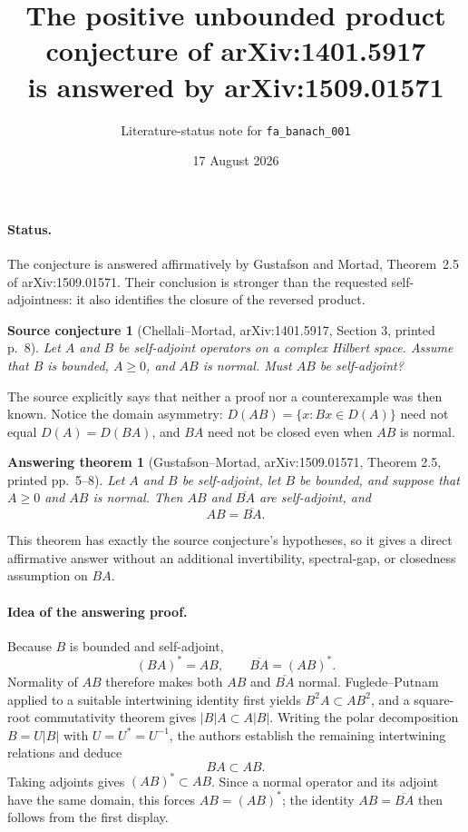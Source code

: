 \documentclass[10pt]{article}
\title{The positive unbounded product conjecture of arXiv:1401.5917\\
is answered by arXiv:1509.01571}
\author{Literature-status note for \texttt{fa\_banach\_001}}
\date{17 August 2026}
\newtheorem*{question}{Source conjecture}
\newtheorem*{answer}{Answering theorem}
\begin{document}
\maketitle

\paragraph{Status.}
The conjecture is answered affirmatively by Gustafson and Mortad,
Theorem~2.5 of arXiv:1509.01571.  Their conclusion is stronger than the
requested self-adjointness: it also identifies the closure of the reversed
product.

\begin{question}[Chellali--Mortad, arXiv:1401.5917, Section 3, printed p.~8]
Let $A$ and $B$ be self-adjoint operators on a complex Hilbert space.  Assume
that $B$ is bounded, $A\geq0$, and $AB$ is normal.  Must $AB$ be
self-adjoint?
\end{question}

The source explicitly says that neither a proof nor a counterexample was then
known.  Notice the domain asymmetry: $D(AB)=\{x:Bx\in D(A)\}$ need not equal
$D(A)=D(BA)$, and $BA$ need not be closed even when $AB$ is normal.

\begin{answer}[Gustafson--Mortad, arXiv:1509.01571, Theorem 2.5,
printed pp.~5--8]
Let $A$ and $B$ be self-adjoint, let $B$ be bounded, and suppose that
$A\geq0$ and $AB$ is normal.  Then $AB$ and $\overline{BA}$ are
self-adjoint, and
\[
   AB=\overline{BA}.
\]
\end{answer}

This theorem has exactly the source conjecture's hypotheses, so it gives a
direct affirmative answer without an additional invertibility, spectral-gap,
or closedness assumption on $BA$.

\paragraph{Idea of the answering proof.}
Because $B$ is bounded and self-adjoint,
\[
  (BA)^*=AB,\qquad \overline{BA}=(AB)^*.
\]
Normality of $AB$ therefore makes both $AB$ and $\overline{BA}$ normal.
Fuglede--Putnam applied to a suitable intertwining identity first yields
$B^2A\subset AB^2$, and a square-root commutativity theorem gives
$|B|A\subset A|B|$.  Writing the polar decomposition
$B=U|B|$ with $U=U^*=U^{-1}$, the authors establish the remaining
intertwining relations and deduce
\[
  BA\subset AB.
\]
Taking adjoints gives $(AB)^*\subset AB$.  Since a normal operator and its
adjoint have the same domain, this forces $AB=(AB)^*$; the identity
$AB=\overline{BA}$ then follows from the first display.
\end{document}
